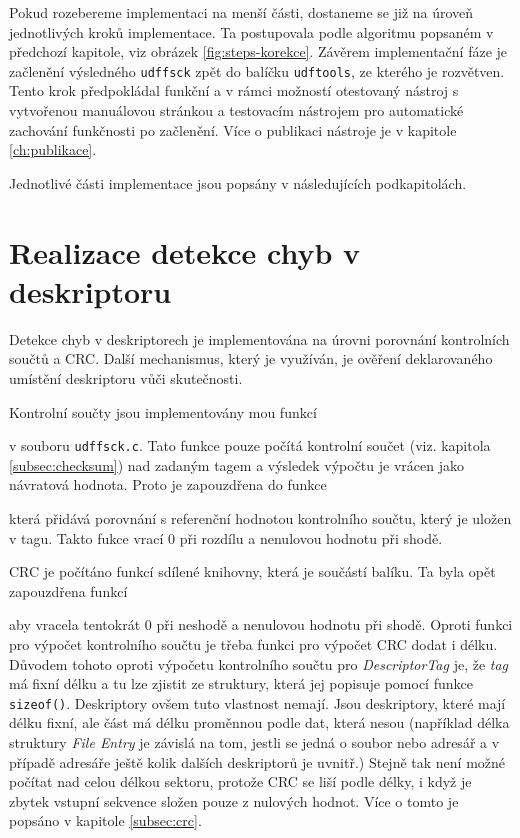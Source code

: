 Pokud rozebereme implementaci na menší části, dostaneme se již na úroveň jednotlivých kroků implementace. Ta postupovala podle algoritmu popsaném v předchozí kapitole, viz obrázek \ref{fig:steps-korekce}.
Závěrem implementační fáze je začlenění výsledného \texttt{udffsck} zpět do balíčku \texttt{udftools}, ze kterého je rozvětven. Tento krok předpokládal funkční a v rámci možností otestovaný nástroj s vytvořenou manuálovou stránkou a testovacím nástrojem pro automatické zachování funkčnosti po začlenění. Více o publikaci nástroje je v kapitole \ref{ch:publikace}.

Jednotlivé části implementace jsou popsány v následujících podkapitolách.

\section{Realizace detekce chyb v deskriptoru}
\label{sec:realizace-detekce}
Detekce chyb v deskriptorech je implementována na úrovni porovnání kontrolních součtů a CRC. Další mechanismus, který je využíván, je ověření deklarovaného umístění deskriptoru vůči skutečnosti.

Kontrolní součty jsou implementovány mou funkcí

\centerline{\texttt{}}

v souboru \texttt{udffsck.c}. Tato funkce pouze počítá kontrolní součet (viz. kapitola \ref{subsec:checksum}) nad zadaným tagem a výsledek výpočtu je vrácen jako návratová hodnota. Proto je zapouzdřena do funkce
 
\centerline{\texttt{}}

která přidává porovnání s referenční hodnotou kontrolního součtu, který je uložen v tagu. Takto fukce vrací 0 při rozdílu a nenulovou hodnotu při shodě.

CRC je počítáno funkcí sdílené knihovny, která je součástí balíku. Ta byla opět zapouzdřena funkcí

\centerline{\texttt{}}

aby vracela tentokrát 0 při neshodě a nenulovou hodnotu při shodě. Oproti funkci pro výpočet kontrolního součtu je třeba funkci pro výpočet CRC dodat i délku. Důvodem tohoto oproti výpočetu kontrolního součtu pro \textit{DescriptorTag} je, že \textit{tag} má fixní délku a tu lze zjistit ze struktury, která jej popisuje pomocí funkce \texttt{sizeof()}. Deskriptory ovšem tuto vlastnost nemají. Jsou deskriptory, které mají délku fixní, ale část má délku proměnnou podle dat, která nesou (například délka struktury \textit{File Entry} je závislá na tom, jestli se jedná o soubor nebo adresář a v případě adresáře ještě kolik dalších deskriptorů je uvnitř.) Stejně tak není možné počítat nad celou délkou sektoru, protože CRC se liší podle délky, i když je zbytek vstupní sekvence složen pouze z nulových hodnot. Více o tomto je popsáno v kapitole \ref{subsec:crc}.

